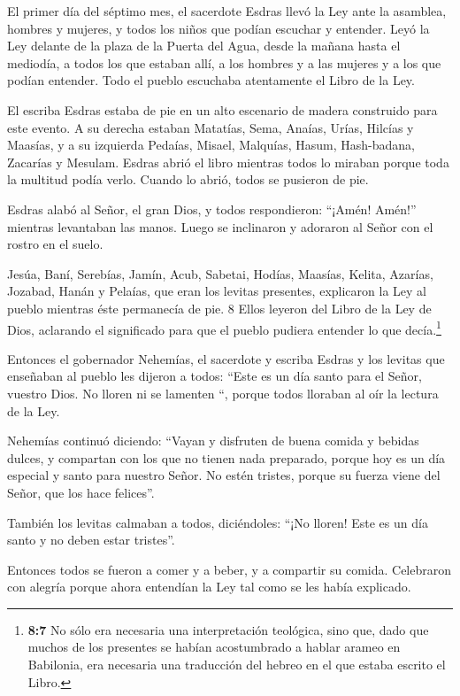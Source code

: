  El primer día del séptimo mes, el sacerdote Esdras llevó la
Ley ante la asamblea, hombres y mujeres, y todos los niños que podían
escuchar y entender.  Leyó la Ley delante de la plaza de la
Puerta del Agua, desde la mañana hasta el mediodía, a todos los que
estaban allí, a los hombres y a las mujeres y a los que podían entender.
Todo el pueblo escuchaba atentamente el Libro de la Ley.

 El escriba Esdras estaba de pie en un alto escenario de
madera construido para este evento. A su derecha estaban Matatías, Sema,
Anaías, Urías, Hilcías y Maasías, y a su izquierda Pedaías, Misael,
Malquías, Hasum, Hash-badana, Zacarías y Mesulam.  Esdras
abrió el libro mientras todos lo miraban porque toda la multitud podía
verlo. Cuando lo abrió, todos se pusieron de pie.

 Esdras alabó al Señor, el gran Dios, y todos respondieron:
``¡Amén! Amén!'' mientras levantaban las manos. Luego se inclinaron y
adoraron al Señor con el rostro en el suelo.

 Jesúa, Baní, Serebías, Jamín, Acub, Sabetai, Hodías,
Maasías, Kelita, Azarías, Jozabad, Hanán y Pelaías, que eran los levitas
presentes, explicaron la Ley al pueblo mientras éste permanecía de pie.
8 Ellos leyeron del Libro de la Ley de Dios, aclarando el significado
para que el pueblo pudiera entender lo que decía.\footnote{\textbf{8:7}
  No sólo era necesaria una interpretación teológica, sino que, dado que
  muchos de los presentes se habían acostumbrado a hablar arameo en
  Babilonia, era necesaria una traducción del hebreo en el que estaba
  escrito el Libro.}

 Entonces el gobernador Nehemías, el sacerdote y escriba
Esdras y los levitas que enseñaban al pueblo les dijeron a todos: ``Este
es un día santo para el Señor, vuestro Dios. No lloren ni se lamenten
``, porque todos lloraban al oír la lectura de la Ley.

 Nehemías continuó diciendo: ``Vayan y disfruten de buena
comida y bebidas dulces, y compartan con los que no tienen nada
preparado, porque hoy es un día especial y santo para nuestro Señor. No
estén tristes, porque su fuerza viene del Señor, que los hace felices''.

 También los levitas calmaban a todos, diciéndoles: ``¡No
lloren! Este es un día santo y no deben estar tristes''.

 Entonces todos se fueron a comer y a beber, y a compartir
su comida. Celebraron con alegría porque ahora entendían la Ley tal como
se les había explicado.

